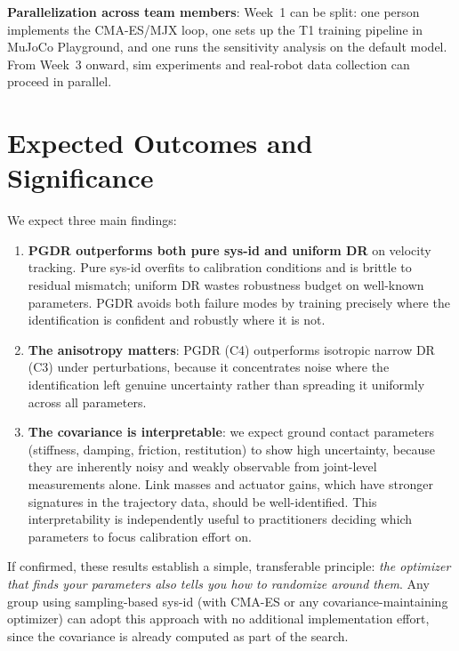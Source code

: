 \documentclass[10pt,twocolumn]{article}
\begin{document}
\textbf{Parallelization across team members}: Week~1 can be split: one person implements the CMA-ES/MJX loop, one sets up the T1 training pipeline in MuJoCo Playground, and one runs the sensitivity analysis on the default model.  From Week~3 onward, sim experiments and real-robot data collection can proceed in parallel.

\section{Expected Outcomes and Significance}

We expect three main findings:

\begin{enumerate}
    \item \textbf{PGDR outperforms both pure sys-id and uniform DR} on velocity tracking.  Pure sys-id overfits to calibration conditions and is brittle to residual mismatch; uniform DR wastes robustness budget on well-known parameters.  PGDR avoids both failure modes by training precisely where the identification is confident and robustly where it is not.
    \item \textbf{The anisotropy matters}: PGDR (C4) outperforms isotropic narrow DR (C3) under perturbations, because it concentrates noise where the identification left genuine uncertainty rather than spreading it uniformly across all parameters.
    \item \textbf{The covariance is interpretable}: we expect ground contact parameters (stiffness, damping, friction, restitution) to show high uncertainty, because they are inherently noisy and weakly observable from joint-level measurements alone.  Link masses and actuator gains, which have stronger signatures in the trajectory data, should be well-identified.  This interpretability is independently useful to practitioners deciding which parameters to focus calibration effort on.
\end{enumerate}

If confirmed, these results establish a simple, transferable principle: \emph{the optimizer that finds your parameters also tells you how to randomize around them}.
Any group using sampling-based sys-id (with CMA-ES or any covariance-maintaining optimizer) can adopt this approach with no additional implementation effort, since the covariance is already computed as part of the search.
\end{document}
